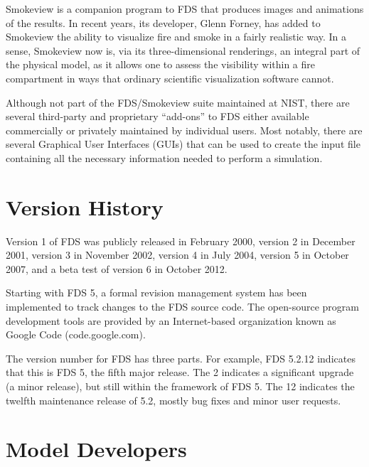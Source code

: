\documentclass[11pt]{book}
\begin{document}
Smokeview is a companion program to FDS that produces images and animations of the results. In recent years, its developer, Glenn Forney, has added
to Smokeview the ability to visualize fire and smoke in a fairly realistic way. In a sense, Smokeview now is, via its three-dimensional renderings,
an integral part of the physical model, as it allows one to assess the visibility within a fire compartment in ways that ordinary scientific
visualization software cannot.

Although not part of the FDS/Smokeview suite maintained at NIST, there are several third-party and proprietary ``add-ons'' to FDS either available
commercially or privately maintained by individual users. Most notably, there are several Graphical User Interfaces (GUIs) that can be used to create
the input file containing all the necessary information needed to perform a simulation.



\section{Version History}

Version 1 of FDS was publicly released in February 2000, version 2 in December 2001, version 3 in November 2002, version 4 in July 2004, version 5 in October 2007, and a beta test of version 6 in October 2012.

Starting with FDS 5, a formal revision management system has been implemented to track changes to the FDS source code. The open-source program
development tools are provided by an Internet-based organization known as Google Code (code.google.com).

The version number for FDS has three parts.  For example, FDS 5.2.12 indicates that this is FDS 5, the fifth major release. The 2 indicates a
significant upgrade (a minor release), but still within the framework of FDS 5.  The 12 indicates the twelfth maintenance release of 5.2, mostly bug fixes and minor user
requests.


\section{Model Developers}
\end{document}
